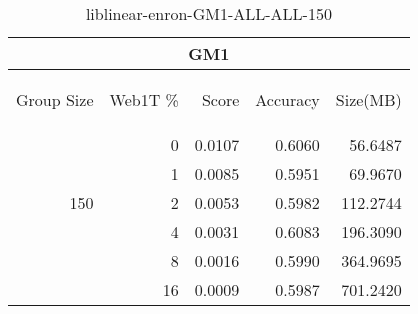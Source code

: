 \begin{center}
\begin{table}[htbp]
\begin{tabular}{ | r | r | r | r | r |}
\hline
\multicolumn{5}{|c|}{GM1}\\
\hline
\begin{sideways}Group Size\end{sideways} & \begin{sideways}Web1T \%\end{sideways} & \begin{sideways}Score\end{sideways} & \begin{sideways}Accuracy\end{sideways} & \begin{sideways}Size(MB)\end{sideways}\\
\hline
\multirow{5}{*}{150}
 & 0 & 0.0107 & 0.6060 & 56.6487\\ \cline{2-5}
 & 1 & 0.0085 & 0.5951 & 69.9670\\ \cline{2-5}
 & 2 & 0.0053 & 0.5982 & 112.2744\\ \cline{2-5}
 & 4 & 0.0031 & 0.6083 & 196.3090\\ \cline{2-5}
 & 8 & 0.0016 & 0.5990 & 364.9695\\ \cline{2-5}
 & 16 & 0.0009 & 0.5987 & 701.2420\\ \cline{2-5}
\hline
\end{tabular}
\caption{liblinear-enron-GM1-ALL-ALL-150}
\label{table:liblinear-enron-GM1-ALL-ALL-150}
\end{table}
\end{center}

